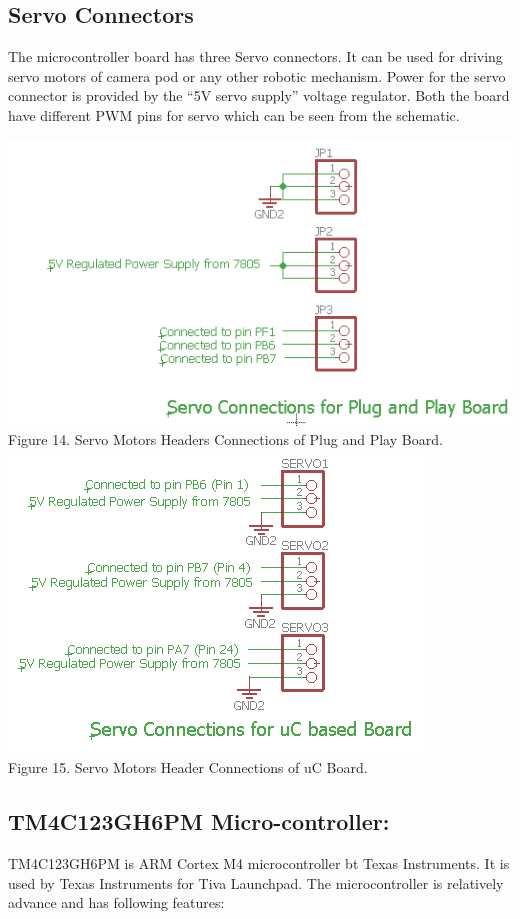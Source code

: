 \documentclass[a4paper,10pt,oneside]{article}
\begin{document}
{	\subsection{\textbf{Servo Connectors}}
	{The microcontroller board has three Servo connectors. It can be used for	driving servo motors of camera pod or any other robotic mechanism. Power for the servo connector is
		provided by the “5V servo supply” voltage regulator. Both the board have different PWM pins for servo which can be seen from the schematic. \\}
		\begin{center}
			\includegraphics{Images/servoPlug}\\
			Figure 14. Servo Motors Headers Connections of Plug and Play Board.\\
			\includegraphics{Images/servouc}\\
			Figure 15. Servo Motors Header Connections of uC Board.\\
		\end{center}
	\subsection{\textbf{TM4C123GH6PM Micro-controller:}}
	{
		TM4C123GH6PM is ARM Cortex M4 microcontroller bt Texas Instruments.
		It is used by Texas Instruments for Tiva Launchpad. The microcontroller is relatively advance and has following features: 
}}
\end{document}
